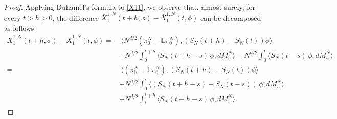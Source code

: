 \documentclass[UTF-8,reqno]{amsart}
\numberwithin{equation}{section}
\begin{document}
\begin{proof}
Applying Duhamel's formula to \eqref{X11}, we observe that, almost surely, for every $t > h > 0$, the difference $\bar{X}^{1,N}_1(t+h,\phi) - \bar{X}^{1,N}_1(t,\phi)$ can be decomposed as follows:
\begin{align*}
\bar{X}^{1,N}_1(t+h,\phi)-\bar{X}^{1,N}_1(t,\phi)
=&\ \langle N^{d/2}(\pi^N_0 - \mathbb{E}\pi^N_0), (S_N(t+h)-S_N(t))\phi \rangle \\
&+ N^{d/2} \int_0^{t+h} \langle S_N(t+h-s)\,\phi,  dM^N_s \rangle 
- N^{d/2} \int_0^t \langle S_N(t-s)\,\phi,  dM^N_s \rangle \\
=&\ \langle (\pi^N_0 - \mathbb{E}\pi^N_0), (S_N(t+h)-S_N(t))\phi \rangle \\
&+ N^{d/2} \int_0^t \langle (S_N(t+h-s) - S_N(t-s))\, \phi, dM^N_s \rangle \\
&+ N^{d/2} \int_t^{t+h} \langle S_N(t+h-s)\,\phi,  dM^N_s \rangle.
\end{align*}


\end{proof}
\end{document}
